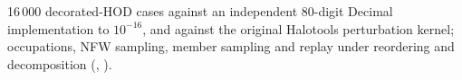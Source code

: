 \begin{validation}
16\,000 decorated-HOD cases against an independent 80-digit Decimal implementation to $10^{-16}$, and against the original Halotools 
perturbation kernel; occupations, NFW sampling, member sampling and replay under reordering and decomposition (,
).
\end{validation}
